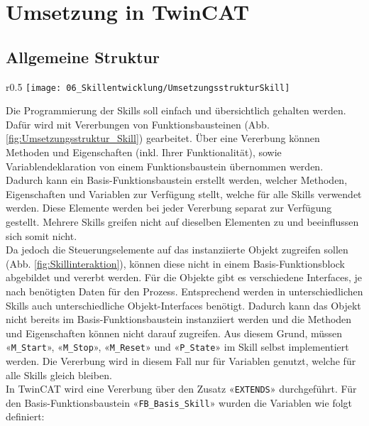 \section{Umsetzung in TwinCAT} \label{Skillumsetzung in TwinCAT}

	\subsection{Allgemeine Struktur} \label{Skill_Allgemeine Struktur}
		 \begin{wrapfigure}{r}{0.5\textwidth}
			\centering
			\texttt{[image: 06\_Skillentwicklung/UmsetzungsstrukturSkill]}
			\captionsetup{justification=centering}
			\caption{Umsetzungsstruktur}
			\label{fig:Umsetzungsstruktur_Skill}
		\end{wrapfigure} \par
		Die Programmierung der Skills soll einfach und übersichtlich gehalten werden. Dafür wird mit Vererbungen von Funktionsbausteinen (Abb. \ref{fig:Umsetzungsstruktur_Skill}) gearbeitet. Über eine Vererbung können Methoden und Eigenschaften (inkl. Ihrer Funktionalität), sowie Variablendeklaration von einem Funktionsbaustein übernommen werden. Dadurch kann ein Basis-Funktionsbaustein erstellt werden, welcher Methoden, Eigenschaften und Variablen zur Verfügung stellt, welche für alle Skills verwendet werden. Diese Elemente werden bei jeder Vererbung separat zur Verfügung gestellt. Mehrere Skills greifen nicht auf dieselben Elementen zu und beeinflussen sich somit nicht. 
		\\
		Da jedoch die Steuerungselemente auf das instanziierte Objekt zugreifen sollen (Abb. \ref{fig:Skillinteraktion}), können diese nicht in einem Basis-Funktionsblock abgebildet und vererbt werden. Für die Objekte gibt es verschiedene Interfaces, je nach benötigten Daten für den Prozess. Entsprechend werden in unterschiedlichen Skills auch unterschiedliche Objekt-Interfaces benötigt. Dadurch kann das Objekt nicht bereits im Basis-Funktionsbaustein instanziiert werden und die Methoden und Eigenschaften können nicht darauf zugreifen. Aus diesem Grund, müssen «\verb|M_Start|», «\verb|M_Stop|», «\verb|M_Reset|» und «\verb|P_State|» im Skill selbst implementiert werden. Die Vererbung wird in diesem Fall nur für Variablen genutzt, welche für alle Skills gleich bleiben.
		\\
		In TwinCAT wird eine Vererbung über den Zusatz «\verb|EXTENDS|» durchgeführt. Für den Basis-Funktionsbaustein «\verb|FB_Basis_Skill|» wurden die Variablen wie folgt definiert: 
		
